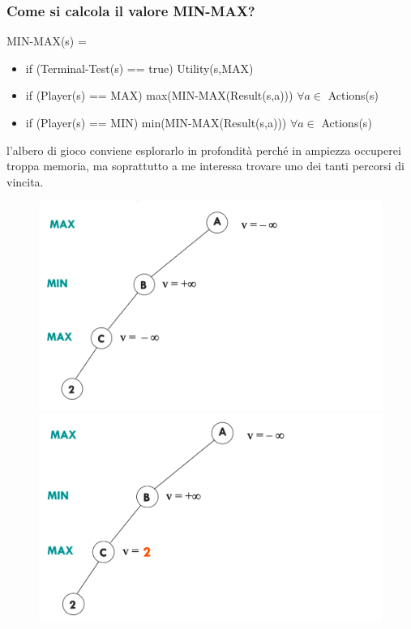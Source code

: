 \documentclass{article}
\begin{document}
\subsubsection{Come si calcola il valore MIN-MAX?}
MIN-MAX(s) =
\begin{itemize}
    \item if (Terminal-Test(s) == true) Utility(s,MAX)
    \item if (Player(s) == MAX) max(MIN-MAX(Result(s,a))) $\forall a \in$ Actions(s)
    \item if (Player(s) == MIN) min(MIN-MAX(Result(s,a))) $\forall a \in$ Actions(s)
\end{itemize}
l'albero di gioco conviene esplorarlo in profondità perché in ampiezza occuperei troppa memoria, ma soprattutto a me interessa trovare uno dei tanti percorsi di vincita.
\newpage
\begin{figure}[H]
\centering
\includegraphics[scale=0.15]{Images/minmaxaction1.png}
\includegraphics[scale=0.15]{Images/minmaxaction2.png}

\end{figure}
\end{document}

